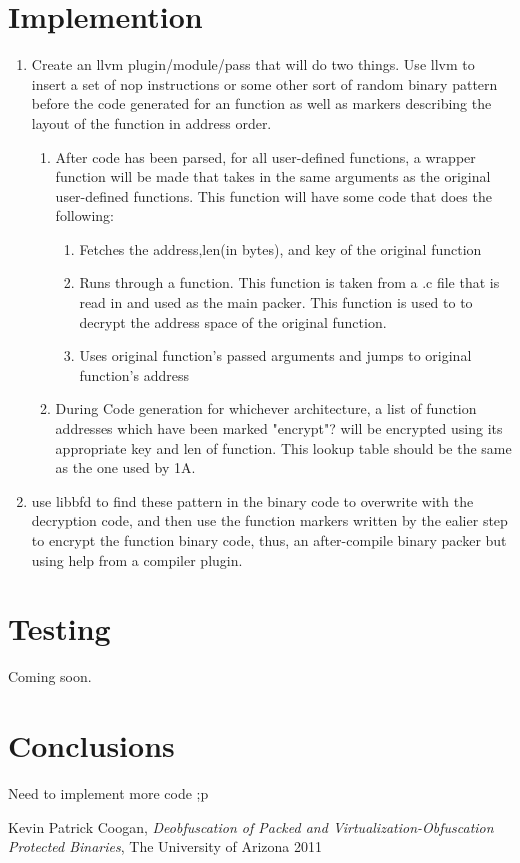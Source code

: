 \documentclass{article}
\begin{document}
\section{Implemention}
\begin{enumerate}
\item Create an llvm plugin/module/pass that will do two things. Use llvm to insert a set of nop instructions or some other sort of 
random binary pattern before the code generated for an function as well as markers describing the layout of the function in address order.
\begin{enumerate}
\item  After code has been parsed, for all user-defined functions, a wrapper function will be made that takes in the same arguments
as the original user-defined functions. This function will have some code that does the following:
\begin{enumerate}
\item Fetches the address,len(in bytes), and key of the original function
\item Runs through a function. This function is taken from a .c file that is read in and used as the main packer. This function is used to to decrypt the address space of the original function.
\item Uses original function's passed arguments and jumps to original function's address
\end{enumerate}
\item During Code generation for whichever architecture, a list of function addresses which have been marked "encrypt"? will be encrypted using its appropriate key and len of function. This lookup table should be the same as the one used by 1A.
\end{enumerate}
\item use libbfd to find these pattern in the binary code to overwrite with the decryption code, and then use the function markers written by the ealier step to encrypt the function binary code, thus, an after-compile binary packer but using help from a compiler plugin.
\end{enumerate}

\section{Testing}
Coming soon.

\section{Conclusions}
Need to implement more code ;p

\begin{thebibliography}{99}
 Kevin Patrick Coogan, \textsl{Deobfuscation of Packed and Virtualization-Obfuscation Protected Binaries}, The University of Arizona  2011
\end{thebibliography}
\end{document}
